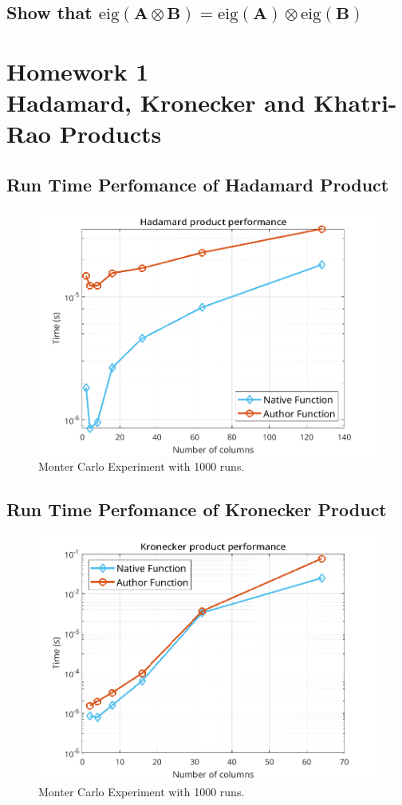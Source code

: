 \documentclass[a4paper,10pt]{article}
\begin{document}
    \subsection*{Show that $\text{eig}(\boldsymbol{A} \otimes \boldsymbol{B}) = \text{eig}(\boldsymbol{A}) \otimes \text{eig}(\boldsymbol{B})$}

\newpage
\section*{Homework 1 \\ Hadamard, Kronecker and Khatri-Rao Products}

    \subsection*{Run Time Perfomance of Hadamard Product}

    \begin{figure}[ht!]
        \centering 
        \includegraphics[width=0.75\linewidth]{figs/hw1a1.png} \par 
        \caption{Monter Carlo Experiment with 1000 runs.}
        \label{fig:hw1a1} 
    \end{figure}

    \subsection*{Run Time Perfomance of Kronecker Product}

    \begin{figure}[ht!]
        \centering 
        \includegraphics[width=0.75\linewidth]{figs/hw1a2.png} \par 
        \caption{Monter Carlo Experiment with 1000 runs.}
        \label{fig:hw1a2} 
    \end{figure}
\end{document}
